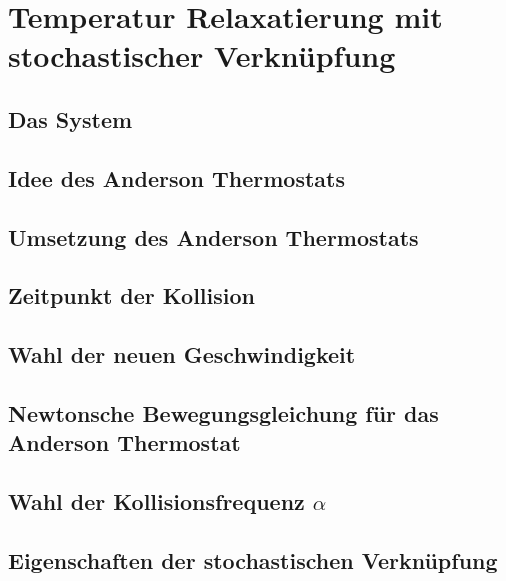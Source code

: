 \documentclass[]{article}
\begin{document}









\section{Temperatur Relaxatierung mit stochastischer Verknüpfung}

\subsection{Das System}

\subsection{Idee des Anderson Thermostats}

\subsection{Umsetzung des Anderson Thermostats}

\subsection{Zeitpunkt der Kollision}

\subsection{Wahl der neuen Geschwindigkeit}

\subsection{Newtonsche Bewegungsgleichung für das Anderson Thermostat}

\subsection{Wahl der Kollisionsfrequenz $\alpha$}

\subsection{Eigenschaften der stochastischen Verknüpfung}
\end{document}
